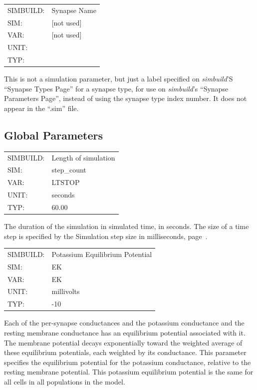 \documentclass[12pt,openany,oneside]{book}
\newcommand{\tiref}[1]{#1, page~\pageref{#1}}
\newcommand{\prog}[1]{\textit{{#1}}}
\newcommand{\ext}[1]{{{``.#1''}}}
\newcommand{\inquotes}[1]{{{``#1''}}}
\begin{document}
\begin{flushleft}
\begin{tabular}{@{}ll@{}}
SIMBUILD: & Synapse Name\\
SIM: & [not used]\\
VAR: & [not used]\\
UNIT: & \\
TYP: &\\
\end{tabular}
\end{flushleft}
\noindent
This is not a simulation parameter, but just a label specified on
\prog{simbuild}'S \inquotes{Synapse Types Page} for a synapse type, for use
on \prog{simbuild}'s \inquotes{Synapse Parameters Page}, instead of using the synapse
type index number. It does not appear in the \ext{sim} file.
\filbreak
\vspace{\baselineskip}

\subsection{Global Parameters}
\label{Global Parameters}

\begin{flushleft}
\begin{tabular}{@{}ll@{}}
SIMBUILD: & Length of simulation\\
SIM: & step\_count\\
VAR: & LTSTOP\\
UNIT: & seconds\\
TYP: & 60.00\\
\end{tabular}
\end{flushleft}
\noindent
The duration of the simulation in simulated time, in seconds. The
size of a time step is specified by the \tiref{Simulation step size in milliseconds}.
\filbreak
\vspace{\baselineskip}

\begin{flushleft}
\begin{tabular}{@{}ll@{}}
SIMBUILD: & Potassium Equilibrium Potential\\
SIM: & EK\\
VAR: & EK\\
UNIT: & millivolts\\
TYP: & -10\\
\end{tabular}
\end{flushleft}
\noindent
Each of the per-synapse conductances and the potassium conductance and
the resting membrane conductance has an equilibrium potential
associated with it. The membrane potential decays exponentially
toward the weighted average of these equilibrium potentials, each
weighted by its conductance. This parameter specifies the equilibrium
potential for the potassium conductance, relative to the resting
membrane potential. This potassium equilibrium potential is the same
for all cells in all populations in the model.
\filbreak
\vspace{\baselineskip}
\end{document}
